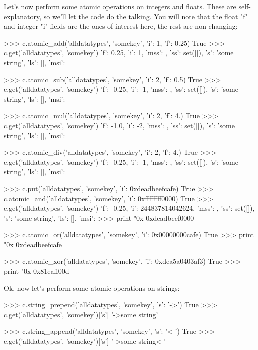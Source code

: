 Let's now perform some atomic operations on integers and floats. These are
self-explanatory, so we'll let the code do the talking. You will note that the
float "f" and integer "i" fields are the ones of interest here, the rest are
non-changing:

\begin{pythoncode}
>>> c.atomic_add('alldatatypes', 'somekey', {'i': 1, 'f': 0.25})
True
>>> c.get('alldatatypes', 'somekey')
{'f': 0.25, 'i': 1, 'mss': {}, 'ss': set([]), 's': 'some string', 'ls': [], 'msi': {}}

>>> c.atomic_sub('alldatatypes', 'somekey', {'i': 2, 'f': 0.5})
True
>>> c.get('alldatatypes', 'somekey')
{'f': -0.25, 'i': -1, 'mss': {}, 'ss': set([]), 's': 'some string', 'ls': [], 'msi': {}}

>>> c.atomic_mul('alldatatypes', 'somekey', {'i': 2, 'f': 4.})
True
>>> c.get('alldatatypes', 'somekey')
{'f': -1.0, 'i': -2, 'mss': {}, 'ss': set([]), 's': 'some string', 'ls': [], 'msi': {}}

>>> c.atomic_div('alldatatypes', 'somekey', {'i': 2, 'f': 4.})
True
>>> c.get('alldatatypes', 'somekey')
{'f': -0.25, 'i': -1, 'mss': {}, 'ss': set([]), 's': 'some string', 'ls': [], 'msi': {}}

>>> c.put('alldatatypes', 'somekey', {'i': 0xdeadbeefcafe})
True
>>> c.atomic_and('alldatatypes', 'somekey', {'i': 0xffffffff0000})
True
>>> c.get('alldatatypes', 'somekey')
{'f': -0.25, 'i': 244837814042624, 'mss': {}, 'ss': set([]), 's': 'some string', 'ls': [], 'msi': {}}
>>> print "0x%
0xdeadbeef0000

>>> c.atomic_or('alldatatypes', 'somekey', {'i': 0x00000000cafe})
True
>>> print "0x%
0xdeadbeefcafe

>>> c.atomic_xor('alldatatypes', 'somekey', {'i': 0xdea5a0403af3})
True
>>> print "0x%
0x81eaff00d
\end{pythoncode}

Ok, now let's perform some atomic operations on strings:

\begin{pythoncode}
>>> c.string_prepend('alldatatypes', 'somekey', {'s': '->'})
True
>>> c.get('alldatatypes', 'somekey')['s']
'->some string'

>>> c.string_append('alldatatypes', 'somekey', {'s': '<-'})
True
>>> c.get('alldatatypes', 'somekey')['s']
'->some string<-'
\end{pythoncode}

